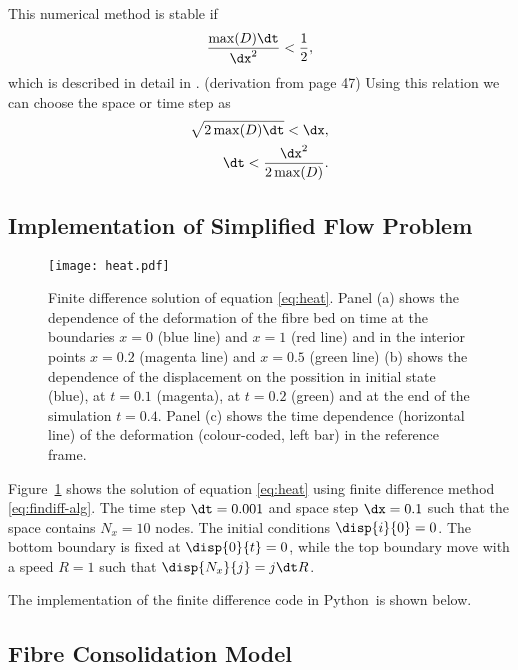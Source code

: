 \documentclass[twoside,a4paper,12pt]{article}
\newcommand{\figref}[1]{Figure~\ref{#1}}
\newcommand{\prog}[1]{\textsf{#1}}
\newcommand{\python}{\prog{Python}}
\newcommand{\note}[1]{{\color{red}(#1)}}
\begin{document}
This numerical method is stable if
\begin{align}
  \frac{\max(D)\dt}{\dx^2} < \frac{1}{2},
\end{align}
which is described in detail in \cite{Strikwerda2004}.
%
\note{derivation from page 47}
%
Using this relation we can choose the space or time step as
%
\begin{align}
  \sqrt{2\max(D)\dt} < \dx, \\
  \dt < \frac{\dx^2}{2\max(D)}.
\end{align}

\subsection{Implementation of Simplified Flow Problem}

\begin{figure}
  \centering
  \texttt{[image: heat.pdf]}
  \caption{Finite difference solution of equation
    \eqref{eq:heat}. Panel (a) shows the dependence of the deformation
    of the fibre bed on time at the boundaries $x=0$ (blue line) and
    $x=1$ (red line) and in the interior points $x=0.2$ (magenta line)
    and $x=0.5$ (green line) (b) shows the dependence of the
    displacement on the possition in initial state (blue), at $t=0.1$
    (magenta), at $t=0.2$ (green) and at the end of the simulation
    $t=0.4$.  Panel (c) shows the time dependence (horizontal line) of
    the deformation (colour-coded, left bar) in the reference frame.}
  \label{fig:findiff-heat}
\end{figure}

\figref{fig:findiff-heat} shows the solution of equation
\eqref{eq:heat} using finite difference method
\eqref{eq:findiff-alg}. The time step $\dt=0.001$ and space step
$\dx = 0.1$ such that the space contains $N_x=10$ nodes. The initial
conditions $\disp{i}{0} = 0$. The bottom boundary is fixed at
$\disp{0}{t} = 0$, while the top boundary move with a speed $R=1$ such
that $\disp{N_x}{j} = j \dt R$.

The implementation of the finite difference code in \python\ is shown
below.
%


\subsection{Fibre Consolidation Model}
\end{document}
